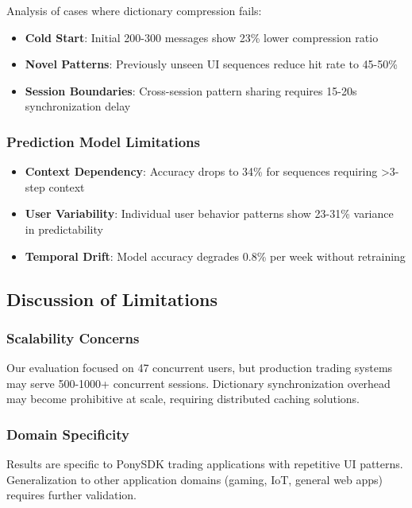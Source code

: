 \documentclass[12pt,a4paper]{article}
\begin{document}
Analysis of cases where dictionary compression fails:

\begin{itemize}
    \item \textbf{Cold Start}: Initial 200-300 messages show 23\% lower compression ratio
    \item \textbf{Novel Patterns}: Previously unseen UI sequences reduce hit rate to 45-50\%
    \item \textbf{Session Boundaries}: Cross-session pattern sharing requires 15-20s synchronization delay
\end{itemize}

\subsubsection{Prediction Model Limitations}

\begin{itemize}
    \item \textbf{Context Dependency}: Accuracy drops to 34\% for sequences requiring >3-step context
    \item \textbf{User Variability}: Individual user behavior patterns show 23-31\% variance in predictability
    \item \textbf{Temporal Drift}: Model accuracy degrades 0.8\% per week without retraining
\end{itemize}

\subsection{Discussion of Limitations}

\subsubsection{Scalability Concerns}

Our evaluation focused on 47 concurrent users, but production trading systems may serve 500-1000+ concurrent sessions. Dictionary synchronization overhead may become prohibitive at scale, requiring distributed caching solutions.

\subsubsection{Domain Specificity}

Results are specific to PonySDK trading applications with repetitive UI patterns. Generalization to other application domains (gaming, IoT, general web apps) requires further validation.
\end{document}

